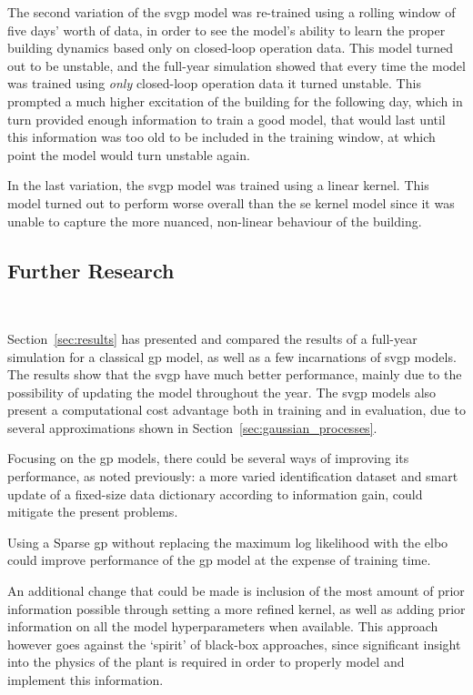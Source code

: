 The second variation of the \acrshort{svgp} model was re-trained using a rolling
window of five days' worth of data, in order to see the model's ability to learn 
the proper building dynamics based only on closed-loop operation data. This
model turned out to be unstable, and the full-year simulation showed that every
time the model was trained using \textit{only} closed-loop operation data it
turned unstable. This prompted a much higher excitation of the building for the
following day, which in turn provided enough information to train a good model,
that would last until this information was too old to be included in the
training window, at which point the model would turn unstable again.

In the last variation, the \acrshort{svgp} model was trained using a linear
kernel. This model turned out to perform worse overall than the \acrshort{se}
kernel model since it was unable to capture the more nuanced, non-linear
behaviour of the building.


\subsection{Further Research}~\label{sec:further_research}

Section~\ref{sec:results} has presented and compared the results of a full-year
simulation for a classical \acrshort{gp} model, as well as a few incarnations of
\acrshort{svgp} models. The results show that the \acrshort{svgp} have much
better performance, mainly due to the possibility of updating the model
throughout the year. The \acrshort{svgp} models also present a computational
cost advantage both in training and in evaluation, due to several approximations
shown in Section~\ref{sec:gaussian_processes}.

Focusing on the \acrshort{gp} models, there could be several ways of improving
its performance, as noted previously: a more varied identification dataset and
smart update of a fixed-size data dictionary according to information gain,
could mitigate the present problems.

Using a Sparse \acrshort{gp} without replacing the maximum log likelihood
with the \acrshort{elbo} could improve performance of the \acrshort{gp} model at
the expense of training time.

An additional change that could be made is inclusion of the most amount of prior
information possible through setting a more refined kernel, as well as adding
prior information on all the model hyperparameters when available. This approach
however goes against the `spirit' of black-box approaches, since significant
insight into the physics of the plant is required in order to properly model and
implement this information.

